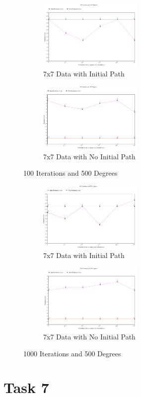 \documentclass[11pt, oneside]{article}   	%
\begin{document}
\begin{figure}[H]
\centering
\begin{subfigure}{.5\textwidth}
	\centering
	\includegraphics[width=50mm]{7x7lowIhighT.png}
	\caption{7x7 Data with Initial Path}
	\label{fig:method}
\end{subfigure}%
\begin{subfigure}{.5\textwidth}
	\centering
	\includegraphics[width=50mm]{7x7lowIhighTPath.png}
	\caption{7x7 Data with No Initial Path}
	\label{fig:method}
\end{subfigure}
\caption{100 Iterations and 500 Degrees}
\end{figure}

\begin{figure}[H]
\centering
\begin{subfigure}{.5\textwidth}
	\centering
	\includegraphics[width=50mm]{7x7highIhighT.png}
	\caption{7x7 Data with Initial Path}
	\label{fig:method}
\end{subfigure}%
\begin{subfigure}{.5\textwidth}
	\centering
	\includegraphics[width=50mm]{7x7highIhighTPath.png}
	\caption{7x7 Data with No Initial Path}
	\label{fig:method}
\end{subfigure}
\caption{1000 Iterations and 500 Degrees}
\end{figure}



\section{Task 7}

\end{document}

